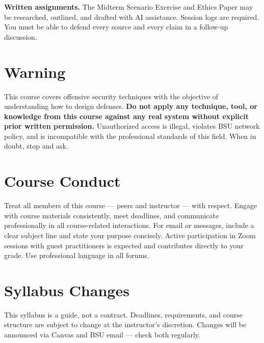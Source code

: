 \documentclass[9pt]{extarticle}
\begin{document}
\medskip

\textbf{Written assignments.} The Midterm Scenario Exercise and Ethics Paper may
be researched, outlined, and drafted with AI assistance. Session logs are required.
You must be able to defend every source and every claim in a follow-up discussion.

\section*{Warning}

This course covers offensive security techniques with the objective of understanding
how to design defenses. \textbf{Do not apply any technique, tool, or knowledge from
this course against any real system without explicit prior written permission.}
Unauthorized access is illegal, violates BSU network policy, and is incompatible
with the professional standards of this field. When in doubt, stop and ask.

\section*{Course Conduct}

Treat all members of this course --- peers and instructor --- with respect.
Engage with course materials consistently, meet deadlines, and communicate
professionally in all course-related interactions. For email or messages,
include a clear subject line and state your purpose concisely. Active
participation in Zoom sessions with guest practitioners is expected and
contributes directly to your grade. Use professional language in all forums.

\section*{Syllabus Changes}

This syllabus is a guide, not a contract. Deadlines, requirements, and course
structure are subject to change at the instructor's discretion. Changes will
be announced via Canvas and BSU email --- check both regularly.
\end{document}
